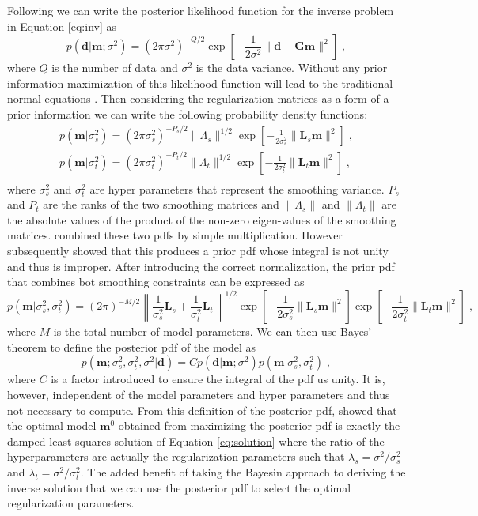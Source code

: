 Following \citet{ide1996} we can write the posterior likelihood function for the inverse problem in Equation \ref{eq:inv} as
\begin{equation}
p(\mathbf{d}|\mathbf{m};\sigma^2)=(2\pi\sigma^2)^{-Q/2}\exp\left[-\frac{1}{2\sigma^2}\|\mathbf{d}-\mathbf{Gm}\|^2\right]\;,
\end{equation}
where $Q$ is the number of data and $\sigma^2$ is the data variance. Without any prior information maximization of this likelihood function will lead to the traditional normal equations \citep{menke2012}. Then considering the regularization matrices as a form of a prior information we can write the following probability density functions:
\begin{eqnarray}
p(\mathbf{m}|\sigma_s^2)=(2\pi\sigma_s^2)^{-P_s/2}\|\Lambda_s\|^{1/2}\exp\left[-\frac{1}{2\sigma_s^2}\|\mathbf{L}_s\mathbf{m}\|^2\right]\;,\\
p(\mathbf{m}|\sigma_t^2)=(2\pi\sigma_t^2)^{-P_t/2}\|\Lambda_t\|^{1/2}\exp\left[-\frac{1}{2\sigma_t^2}\|\mathbf{L}_t\mathbf{m}\|^2\right]\;,\\
\end{eqnarray}
where $\sigma^2_s$ and $\sigma^2_t$ are hyper parameters that represent the smoothing variance. $P_s$ and $P_t$ are the ranks of the two smoothing matrices and $\|\Lambda_s\|$ and $\|\Lambda_t\|$ are the absolute values of the product of the non-zero eigen-values of the smoothing matrices. \citet{ide1996} combined these two pdfs by simple multiplication. However \citet{fukahata2003} subsequently showed that this produces a prior pdf whose integral is not unity and thus is improper. After introducing the correct normalization, the prior pdf that combines bot smoothing constraints can be expressed as
\begin{equation}
p(\mathbf{m}|\sigma_s^2,\sigma^2_t)=(2\pi)^{-M/2}\left\|\frac{1}{\sigma_s^2}\mathbf{L}_s+\frac{1}{\sigma_t^2}\mathbf{L}_t \right\|^{1/2}\exp\left[-\frac{1}{2\sigma_s^2}\|\mathbf{L}_s\mathbf{m}\|^2\right]\exp\left[-\frac{1}{2\sigma_t^2}\|\mathbf{L}_t\mathbf{m}\|^2\right]\;,
\end{equation}
where $M$ is the total number of model parameters. We can then use Bayes' theorem to define the posterior pdf of the model as
\begin{equation}
p(\mathbf{m};\sigma_s^2,\sigma_t^2,\sigma^2|\mathbf{d})=Cp(\mathbf{d}|\mathbf{m};\sigma^2)p(\mathbf{m}|\sigma_s^2,\sigma^2_t)\;,
\end{equation}
where $C$ is  a factor introduced to ensure the integral of the pdf us unity. It is, however, independent of the model parameters and hyper parameters and thus not necessary to compute. From this definition of the posterior pdf, \citet{jackson1985} showed that the optimal model $\mathbf{m}^0$ obtained from maximizing the posterior pdf is exactly the damped least squares solution of Equation \ref{eq:solution} where the ratio of the hyperparameters are actually the regularization parameters such that $\lambda_s=\sigma^2/\sigma^2_s$ and $\lambda_t=\sigma^2/\sigma^2_t$. The added benefit of taking the Bayesin approach to deriving the inverse solution that we can use the posterior pdf to select the optimal regularization parameters.
	
